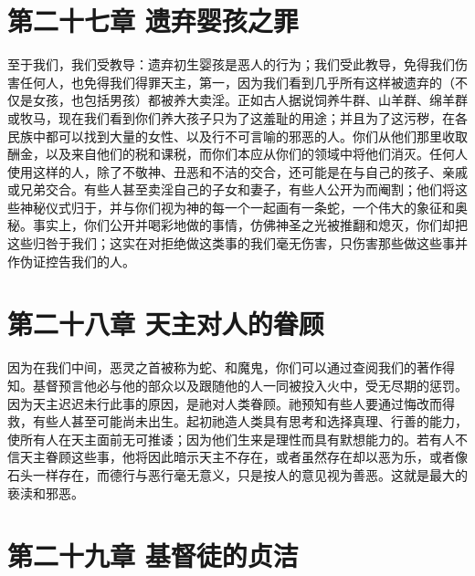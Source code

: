 
\section{第二十七章 遗弃婴孩之罪}

至于我们，我们受教导：遗弃初生婴孩是恶人的行为；我们受此教导，免得我们伤害任何人，也免得我们得罪天主，第一，因为我们看到几乎所有这样被遗弃的（不仅是女孩，也包括男孩）都被养大卖淫。正如古人据说饲养牛群、山羊群、绵羊群或牧马，现在我们看到你们养大孩子只为了这羞耻的用途；并且为了这污秽，在各民族中都可以找到大量的女性、以及行不可言喻的邪恶的人。你们从他们那里收取酬金，以及来自他们的税和课税，而你们本应从你们的领域中将他们消灭。任何人使用这样的人，除了不敬神、丑恶和不洁的交合，还可能是在与自己的孩子、亲戚或兄弟交合。有些人甚至卖淫自己的子女和妻子，有些人公开为而阉割；他们将这些神秘仪式归于，并与你们视为神的每一个一起画有一条蛇，一个伟大的象征和奥秘。事实上，你们公开并喝彩地做的事情，仿佛神圣之光被推翻和熄灭，你们却把这些归咎于我们；这实在对拒绝做这类事的我们毫无伤害，只伤害那些做这些事并作伪证控告我们的人。\par


\section{第二十八章 天主对人的眷顾}

因为在我们中间，恶灵之首被称为蛇、和魔鬼，你们可以通过查阅我们的著作得知。基督预言他必与他的部众以及跟随他的人一同被投入火中，受无尽期的惩罚。因为天主迟迟未行此事的原因，是祂对人类眷顾。祂预知有些人要通过悔改而得救，有些人甚至可能尚未出生。起初祂造人类具有思考和选择真理、行善的能力，使所有人在天主面前无可推诿；因为他们生来是理性而具有默想能力的。若有人不信天主眷顾这些事，他将因此暗示天主不存在，或者虽然存在却以恶为乐，或者像石头一样存在，而德行与恶行毫无意义，只是按人的意见视为善恶。这就是最大的亵渎和邪恶。\par


\section{第二十九章 基督徒的贞洁}

